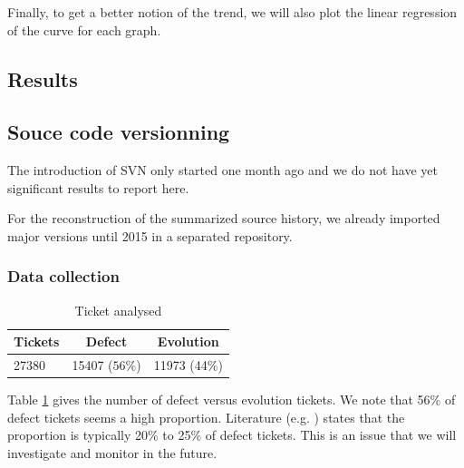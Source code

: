 \documentclass[10pt,conference]{IEEEtran}
\begin{document}
Finally, to get a better notion of the trend, we will also plot the linear regression of the curve for each graph.

\subsection{Results}

\subsection{Souce code versionning}

The introduction of SVN only started one month ago and we do not have yet significant results to report here.

For the reconstruction of the summarized source history, we already imported major versions until 2015 in a separated repository. 

\subsubsection{Data collection}

\begin{table}[htbp]
  \begin{center}
    \caption{Ticket analysed}
    \label{tab:proportion}
    \begin{tabular}{| l | c |c|}
      \hline
      Tickets & Defect  & Evolution  \\
      \hline
      27380&15407 ($56\%$)&11973 (44\%)\\
      \hline 
    \end{tabular}
  \end{center}  
\end{table}

Table \ref{tab:proportion} gives the number of defect versus evolution tickets.
We note that 56\% of defect tickets seems a high proportion.
Literature (e.g. \cite{Pigo96a} ) states that the proportion is typically 20\% to 25\% of defect tickets.
This is an issue that we will investigate and monitor in the future.
\end{document}
